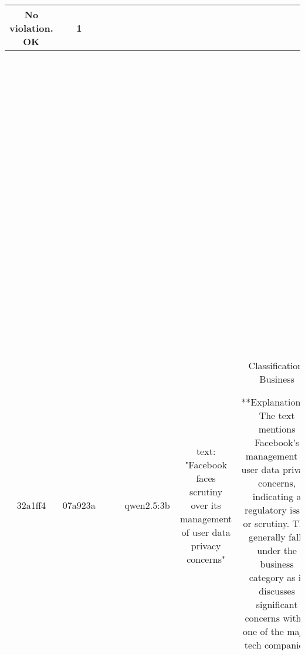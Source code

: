 \begin{table}[h!]
\begin{tabular}{|c|c|c|c|c|c|c|c|c|c|}
No violation.
OK & 1\\
\hline
32a1ff4 & 07a923a &  &  & qwen2.5:3b & text: "Facebook faces scrutiny over its management of user data privacy concerns" & Classification: Business

**Explanation:** The text mentions Facebook's management of user data privacy concerns, indicating a regulatory issue or scrutiny. This generally falls under the business category as it discusses significant concerns within one of the major tech companies. & ok & The chatbot output provides a classification of "Business" and an explanation for this choice. According to the description, a classification label should be one of the following categories: World, Sports, Business, or Sci/Tech. The output "Business" aligns with these specified categories. Furthermore, the explanation supports the "Business" classification by mentioning the management of user data privacy concerns related to a major tech company, which typically falls under the business domain. There is no part of the description mentioning the necessity of providing an explanation, but an explanation does not violate the description provided. 

No violation.
OK & 1\\
\hline
32a1ff4 & 07a923a &  &  & gemma2:9b & text: "Facebook faces scrutiny over its management of user data privacy concerns" & This article falls under the **Business** category. 

Here's why:

* **Topic:**  The article discusses Facebook and its handling of user data privacy, which are significant issues in the business world.  
* **Relevance to Business:** Data privacy is a crucial regulatory and reputational concern for technology companies like Facebook.  


Let me know if you have any other articles you'd like me to classify! 
 & ok & The evaluation of the output focuses on compliance with the description provided. The output complies with the requirement to classify the text into a specific category, namely, it categorizes the article as "Business." The explanation provided supports this classification by discussing the relevance of data privacy in the business world, especially for technology companies. Additionally, the output stays within the domain of classifying text and does not introduce any new categories not mentioned in the description. 

No violation.
OK & 1\\
\hline
1d4158e & 07a923a &  &  & llama3.2:1b & text: "Amazon reports record profits amid increase in online shopping trends" & Based on the provided input text, I would classify it into the category: Business.


\end{tabular}
\end{table}
